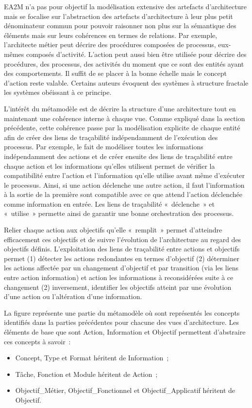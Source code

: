     EA2M n'a pas pour objectif la modélisation extensive des artefacts d'architecture mais se focalise sur
    l'abstraction des artefacts d'architecture à leur plus petit dénominateur commun pour pouvoir raisonner non plus
    sur la sémantique des éléments mais sur leurs cohérences en termes de relations. Par exemple, l'architecte métier 
    peut décrire des procédures composées de processus, eux-mêmes composés d'activité. L'action peut aussi bien
    être utilisée pour décrire des procédures, des processus, des activités du moment que ce sont des entités ayant
    des comportements. Il suffit de se placer à la bonne échelle mais le concept d'action reste valable. Certains auteurs
    évoquent des systèmes à structure fractale les systèmes obéissant à ce principe.

    L'intérêt du métamodèle est de décrire la structure d'une architecture tout en maintenant une cohérence interne
    à chaque vue. Comme expliqué dans la section précédente, cette cohérence passe par la modélisation explicite
    de chaque entité afin de créer des liens de traçabilité indépendamment de l’exécution des processus.
    Par exemple, le fait de modéliser toutes les informations indépendamment des actions et de créer ensuite 
    des liens de traçabilité entre chaque action et les informations qu'elles utilisent permet de vérifier la compatibilité
    entre l'action et l'information qu'elle utilise avant même d'exécuter le processus. Ainsi, si une action déclenche une autre
    action, il faut l'information à la sortie de la première sont compatible avec ce que attend l'action déclenchée 
    comme information en entrée. Les liens de traçabilité «~déclenche~» et «~utilise~» permette ainsi de garantir
    une bonne orchestration des processus.

    Relier chaque action aux objectifs qu'elle «~remplit~» permet d'atteindre efficacement ces objectifs et de suivre l’évolution
    de l'architecture au regard des objectifs définis. L'exploitation des liens de traçabilité entre actions et objectifs
    permet (1) détecter les actions redondantes en termes d'objectif (2) déterminer les actions affectée par un changement
    d'objectif et par transition (via les liens entre action information) et action les informations à reconsidérées suite à ce
    changement (2) inversement, identifier les objectifs atteint par une évolution d'une action ou l'altération d'une information.

    La figure représente une  partie du métamodèle où sont représentés les concepts identifiés dans la parties précédentes
    pour chacune des vues d'architecture. Les éléments de base que sont Action, Information et Objectif permettent
    d’abstraire ces concepts à savoir~:
    \begin{itemize}
    \item Concept, Type et Format héritent de Information~;
    \item Tâche, Fonction et Module héritent de Action~;
    \item Objectif\_Métier, Objectif\_Fonctionnel et Objectif\_Applicatif héritent de Objectif.
    \end{itemize}

